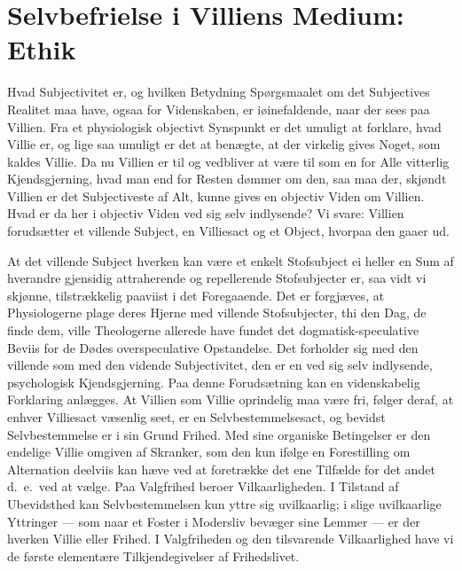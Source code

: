 \documentclass[12pt]{book}
\newcommand{\apage}[1]{\marginnote{\footnotesize\textit{[#1]}}}
\begin{document}
\section{Selvbefrielse i Villiens Medium: Ethik}
\label{sec:24}

\noindent Hvad Subjectivitet er, og hvilken Betydning Spørgsmaalet om det
Subjectives Realitet maa have, ogsaa for Videnskaben, er iøinefaldende, naar
der sees paa Villien. Fra et physiologisk objectivt Synspunkt er det umuligt
at forklare, hvad Villie er, og lige saa umuligt er det at benægte, at der
virkelig gives Noget, som kaldes Villie. Da nu Villien er til og vedbliver at
være til som en for Alle vitterlig Kjendsgjerning, hvad man end for Resten
dømmer om den, saa maa der, skjøndt Villien er det Subjectiveste af Alt, kunne
gives en objectiv Viden om Villien. Hvad er da her i objectiv Viden ved sig
selv indlysende? Vi svare: Villien forudsætter et villende Subject, en
Villiesact og et Object, hvorpaa den gaaer ud.

\apage{259} At det villende Subject hverken kan være et enkelt Stofsubject ei heller en
Sum af hverandre gjensidig attraherende og repellerende Stofsubjecter er, saa
vidt vi skjønne, tilstrækkelig paaviist i det Foregaaende. Det er forgjæves,
at Physiologerne plage deres Hjerne med villende Stofsubjecter, thi den Dag,
de finde dem, ville Theologerne allerede have fundet det dogmatisk-speculative
Beviis for de Dødes overspeculative Opstandelse. Det forholder sig med den
villende som med den vidende Subjectivitet, den er en ved sig selv indlysende,
psychologisk Kjendsgjerning. Paa denne Forudsætning kan en videnskabelig
Forklaring anlægges. At Villien som Villie oprindelig maa være fri, følger
deraf, at enhver Villiesact væsenlig seet, er en Selvbestemmelsesact, og
bevidst Selvbestemmelse er i sin Grund Frihed. Med sine organiske Betingelser
er den endelige Villie omgiven af Skranker, som den kun ifølge en Forestilling
om Alternation deelviis kan hæve ved at foretrække det ene Tilfælde for det
andet d.\ e.\ ved at vælge. Paa Valgfrihed beroer Vilkaarligheden. I Tilstand
af Ubevidsthed kan Selvbestemmelsen kun yttre sig uvilkaarlig; i slige
uvilkaarlige Yttringer --- som naar et Foster i Modersliv bevæger sine Lemmer --- er der hverken Villie eller Frihed. I Valgfriheden og den tilsvarende
Vilkaarlighed have vi de første elementære Tilkjendegivelser af Frihedslivet.
\end{document}
